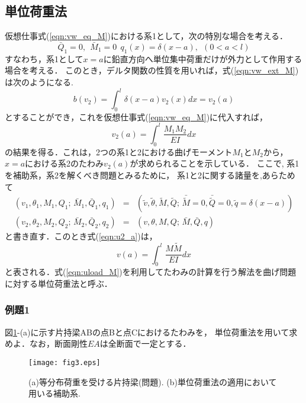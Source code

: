 \documentclass[10pt,a4j]{jarticle}
\begin{document}
\subsection{単位荷重法}
仮想仕事式(\ref{eqn:vw_eq_M})における系1として，次の特別な場合を考える．
\begin{equation}
	\bar Q_1=0,\ \ \bar M_1=0\ \ q_1(x)=\delta(x-a), \ \ (0<a<l)
	\label{eqn:sys1_M}
\end{equation}
すなわち，系1として$x=a$に鉛直方向へ単位集中荷重だけが外力として作用する場合を考える．
このとき，デルタ関数の性質を用いれば，式(\ref{eqn:vw_ext_M})は次のようになる. 
\begin{equation}
	b(v_2)=\int_0^l \delta(x-a)v_2(x)dx= v_2(a)
	\label{eqn:vw_eq_dlt}
\end{equation}
とすることができ，これを仮想仕事式(\ref{eqn:vw_eq_M})に代入すれば，
\begin{equation}
	v_2(a)=\int_0^l \frac{M_1M_2}{EI}dx
	\label{eqn:u2_a}
\end{equation}
の結果を得る．これは，2つの系1と2における曲げモーメント$M_1$と$M_2$から，
$x=a$における系2のたわみ$v_2(a)$が求められることを示している．
ここで, 系1を補助系，系2を解くべき問題とみるために，
系1と2に関する諸量を,あらためて 
\begin{eqnarray}
	\left( v_1, \theta_1, M_1, Q_1;\, \bar M_1, \bar Q_1, q_1 \right)& = &
		\left(\tilde v, \tilde \theta, \tilde M, \tilde Q;\, 
		\bar{\tilde{M}}=0, \bar{\tilde{Q}}=0, \tilde q= \delta(x-a) \right) 
	\label{eqn:aux}
	\\
	\left( v_2, \theta_2, M_2, Q_2 ;\, \bar M_2, \bar Q_2, q_2 \right)& = &
		\left( v,\theta,M, Q;\, \bar M,\bar Q, q \right) 
	\label{eqn:prb_M}
\end{eqnarray}
と書き直す．このとき式(\ref{eqn:u2_a})は，
\begin{equation}
	v(a)=\int_0^l \frac{M \tilde M}{EI}dx
	\label{eqn:uload_M}
\end{equation}
と表される．式(\ref{eqn:uload_M})を利用してたわみの計算を行う解法を曲げ問題に対する単位荷重法と呼ぶ．
\subsubsection{例題1}
図\ref{fig:fig2_3}-(a)に示す片持梁ABの点Bと点Cにおけるたわみを，
単位荷重法を用いて求めよ．なお，断面剛性$EA$は全断面で一定とする．
\begin{figure}[h]
	\begin{center}
	\texttt{[image: fig3.eps]} 
	\end{center}
	\caption{(a)等分布荷重を受ける片持梁(問題).
	 (b)単位荷重法の適用において用いる補助系.} 
	\label{fig:fig2_3}
\end{figure}
\end{document}
